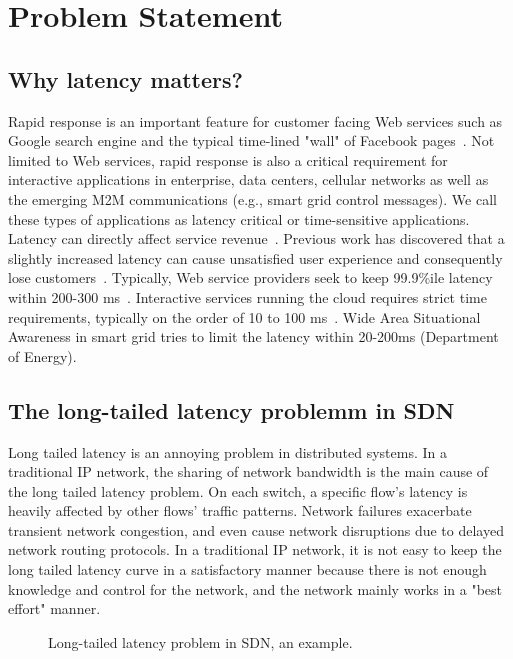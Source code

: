 \section{Problem Statement}\label{sec-statement}
\subsection{Why latency matters?}
Rapid response is an important feature for customer facing Web services such as 
Google search engine and the typical time-lined "wall" of Facebook pages~\cite{wilson2011better}. 
Not limited to Web services, rapid response is also a critical requirement for 
interactive applications in enterprise, data centers, cellular networks 
as well as the emerging M2M communications (e.g., smart grid control messages). 
We call these types of applications as latency critical or time-sensitive applications. 
Latency can directly affect service revenue~\cite{latencycostyou,googlelession}. 
Previous work has discovered that a slightly increased latency can cause unsatisfied user experience 
and consequently lose customers~\cite{hajjat2012dealer,dean2013tail,alizadeh2010data,zats2012detail,vamanan2012deadline}. 
Typically, Web service providers seek to keep 99.9\%ile latency within 200-300 ms~\cite{wilson2011better,alizadeh2010data}.
Interactive services running the cloud requires strict time requirements, typically on the order of 10 to 100 ms~\cite{stephens2012past}. 
Wide Area Situational Awareness in smart grid tries to limit the latency within 20-200ms (Department of Energy). 

\subsection{The long-tailed latency problemm in SDN}

Long tailed latency is an annoying problem in
distributed systems. In a traditional IP network,
the sharing of network bandwidth is the main
cause of the long tailed latency problem. On
each switch, a specific flow's latency is heavily
affected by other flows' traffic patterns.
Network failures exacerbate transient network
congestion, and even cause network disruptions
due to delayed network routing protocols. In a
traditional IP network, it is not easy to keep the
long tailed latency curve in a satisfactory
manner because there is not enough knowledge
and control for the network, and the network
mainly works in a "best effort" manner.


\begin{figure}
\centering
{}
\caption{Long-tailed latency problem in SDN, an example.}\label{latency_example}
\end{figure}


